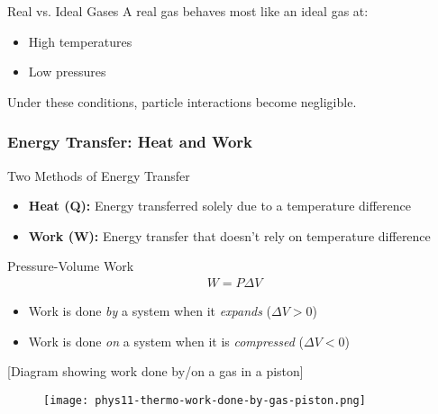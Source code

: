 \documentclass{beamer}
\begin{document}
\begin{frame}
    \begin{exampleblock}{Real vs. Ideal Gases}
        A real gas behaves most like an ideal gas at:
        \begin{itemize}
            \item High temperatures
            \item Low pressures
        \end{itemize}
        Under these conditions, particle interactions become negligible.
    \end{exampleblock}
\end{frame}

\begin{frame}
    \frametitle{Energy Transfer: Heat and Work}
    \begin{block}{Two Methods of Energy Transfer}
        \begin{itemize}
            \item \textbf{Heat (Q):} Energy transferred solely due to a temperature difference
            \item \textbf{Work (W):} Energy transfer that doesn't rely on temperature difference
        \end{itemize}
    \end{block}
    
    \begin{exampleblock}{Pressure-Volume Work}
        \begin{align*}
            W = P\Delta V
        \end{align*}
        
        \begin{itemize}
            \item Work is done \textit{by} a system when it \textit{expands} ($\Delta V > 0$)
            \item Work is done \textit{on} a system when it is \textit{compressed} ($\Delta V < 0$)
        \end{itemize}
    \end{exampleblock}
    
    \begin{center}
        \alert{[Diagram showing work done by/on a gas in a piston]}
    \end{center}
\end{frame}

\begin{frame}
\begin{figure}
    \centering
    \texttt{[image: phys11-thermo-work-done-by-gas-piston.png]}
\end{figure}
\end{frame}
\end{document}
